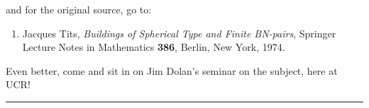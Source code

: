\documentclass{article}
\def\tightlist{}
\begin{document}
and for the original source, go to:

\begin{enumerate}
\def\labelenumi{\arabic{enumi})}
\setcounter{enumi}{5}
\tightlist
\item
  Jacques Tits, \emph{Buildings of Spherical Type and Finite BN-pairs},
  Springer Lecture Notes in Mathematics \textbf{386}, Berlin, New York,
  1974.
\end{enumerate}

Even better, come and sit in on Jim Dolan's seminar on the subject, here
at UCR!

\begin{center}\rule{0.5\linewidth}{0.5pt}\end{center}
\end{document}
